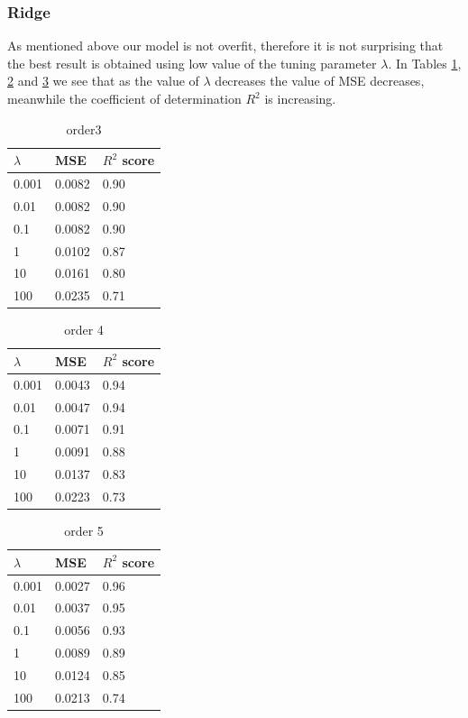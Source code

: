 \documentclass [11pt]{article}
\begin{document}
\subsubsection{Ridge}
As mentioned above our model is not overfit, therefore it is not surprising that the best result is obtained using low value of the tuning parameter $\lambda$. In Tables \ref{tab:ridge3}, \ref{tab:ridge4} and \ref{tab:ridge5} we see that as the value of $\lambda$ decreases the value of MSE decreases, meanwhile the coefficient of determination $R^{2}$ is increasing.
\begin{table}[H]
\centering
\begin{tabular}{lll}
\hline
$\lambda$ & MSE    & $R^{2}$ score \\ \hline
0.001     & 0.0082 & 0.90          \\
0.01      & 0.0082 & 0.90          \\
0.1       & 0.0082 & 0.90          \\
1         & 0.0102 & 0.87          \\
10        & 0.0161 & 0.80          \\
100       & 0.0235 & 0.71          \\ \hline
\end{tabular}
\caption{order3}
\label{tab:ridge3}
\end{table}

\begin{table}[H]
\centering
\begin{tabular}{lll}
\hline
$\lambda$ & MSE    & $R^{2}$ score \\ \hline
0.001     & 0.0043 & 0.94          \\
0.01      & 0.0047 & 0.94          \\
0.1       & 0.0071 & 0.91          \\
1         & 0.0091 & 0.88          \\
10        & 0.0137 & 0.83          \\
100       & 0.0223 & 0.73          \\ \hline
\end{tabular}
\caption{order 4}
\label{tab:ridge4}
\end{table}

\begin{table}[H]
\centering
\begin{tabular}{lll}
\hline
$\lambda$ & MSE    & $R^{2}$ score \\ \hline
0.001     & 0.0027 & 0.96          \\
0.01      & 0.0037 & 0.95          \\
0.1       & 0.0056 & 0.93          \\
1         & 0.0089 & 0.89          \\
10        & 0.0124 & 0.85          \\
100       & 0.0213 & 0.74          \\ \hline
\end{tabular}
\caption{order 5}
\label{tab:ridge5}
\end{table}
\end{document}
